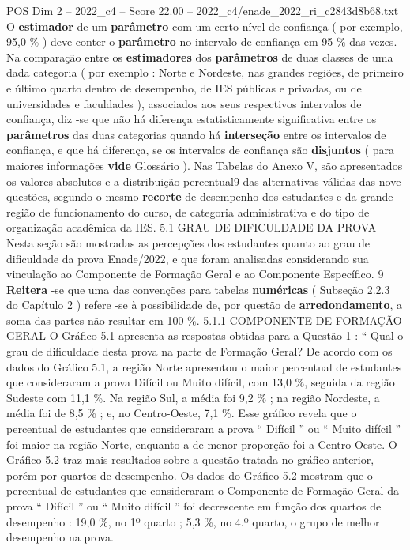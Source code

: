 \begin{textsample}{POS Dim 2 – 2022\_c4 – Score 22.00 – 2022\_c4/enade\_2022\_ri\_c2843d8b68.txt}
O \textbf{estimador} de um \textbf{parâmetro} com um certo nível de confiança ( por exemplo, 95,0 \% ) deve conter o \textbf{parâmetro} no intervalo de confiança em 95 \% das vezes.
Na comparação entre os \textbf{estimadores} dos \textbf{parâmetros} de duas classes de uma dada categoria ( por exemplo : Norte e Nordeste, nas grandes regiões, de primeiro e último quarto dentro de desempenho, de IES públicas e privadas, ou de universidades e faculdades ), associados aos seus respectivos intervalos de confiança, diz -se que não há diferença estatisticamente significativa entre os \textbf{parâmetros} das duas categorias quando há \textbf{interseção} entre os intervalos de confiança, e que há diferença, se os intervalos de confiança são \textbf{disjuntos} ( para maiores informações \textbf{vide} Glossário ).
Nas Tabelas do Anexo V, são apresentados os valores absolutos e a distribuição percentual9 das alternativas válidas das nove questões, segundo o mesmo \textbf{recorte} de desempenho dos estudantes e da grande região de funcionamento do curso, de categoria administrativa e do tipo de organização acadêmica da IES. 5.1 GRAU DE DIFICULDADE DA PROVA Nesta seção são mostradas as percepções dos estudantes quanto ao grau de dificuldade da prova Enade/2022, e que foram analisadas considerando sua vinculação ao Componente de Formação Geral e ao Componente Específico. 9 \textbf{Reitera} -se que uma das convenções para tabelas \textbf{numéricas} ( Subseção 2.2.3 do Capítulo 2 ) refere -se à possibilidade de, por questão de \textbf{arredondamento}, a soma das partes não resultar em 100 \%. 5.1.1 COMPONENTE DE FORMAÇÃO GERAL O Gráfico 5.1 apresenta as respostas obtidas para a Questão 1 : “ Qual o grau de dificuldade desta prova na parte de Formação Geral?
De acordo com os dados do Gráfico 5.1, a região Norte apresentou o maior percentual de estudantes que consideraram a prova Difícil ou Muito difícil, com 13,0 \%, seguida da região Sudeste com 11,1 \%.
Na região Sul, a média foi 9,2 \% ; na região Nordeste, a média foi de 8,5 \% ; e, no Centro-Oeste, 7,1 \%.
Esse gráfico revela que o percentual de estudantes que consideraram a prova “ Difícil ” ou “ Muito difícil ” foi maior na região Norte, enquanto a de menor proporção foi a Centro-Oeste.
O Gráfico 5.2 traz mais resultados sobre a questão tratada no gráfico anterior, porém por quartos de desempenho.
Os dados do Gráfico 5.2 mostram que o percentual de estudantes que consideraram o Componente de Formação Geral da prova “ Difícil ” ou “ Muito difícil ” foi decrescente em função dos quartos de desempenho : 19,0 \%, no 1º quarto ; 5,3 \%, no 4.º quarto, o grupo de melhor desempenho na prova.

\end{textsample}
